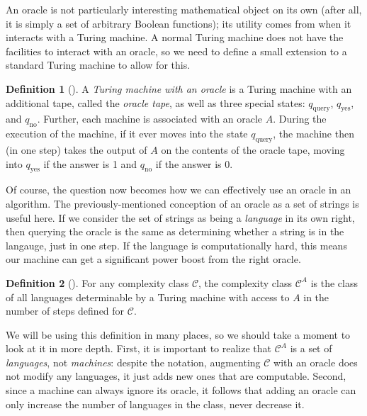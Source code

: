 \documentclass[english,12pt]{reedthesis}
\theoremstyle{plain}
\theoremstyle{definition}
\newtheorem{defn}[defn]{Definition}
\theoremstyle{remark}
\begin{document}

An oracle is not particularly interesting mathematical object on its own (after
all, it is simply a set of arbitrary Boolean functions); its utility comes from
when it interacts with a Turing machine. A normal Turing machine does not have
the facilities to interact with an oracle, so we need to define a small
extension to a standard Turing machine to allow for this.

\begin{defn}[{\cite[Def.\ 3.6]{AB09}}]\label{def:tm-oracle}
  A \emph{Turing machine with an oracle} is a Turing machine with an additional
  tape, called the \emph{oracle tape}, as well as three special states:
  $q_{\text{query}}$, $q_{\text{yes}}$, and $q_{\text{no}}$. Further, each
  machine is associated with an oracle $A$. During the execution of the machine,
  if it ever moves into the state $q_{\text{query}}$, the machine then (in one
  step) takes the output of $A$ on the contents of the oracle tape, moving into
  $q_{\text{yes}}$ if the answer is 1 and $q_{\text{no}}$ if the answer is 0.
\end{defn}

Of course, the question now becomes how we can effectively use an oracle in an
algorithm. The previously-mentioned conception of an oracle as a set of strings
is useful here. If we consider the set of strings as being a \emph{language} in
its own right, then querying the oracle is the same as determining whether a
string is in the langauge, just in one step. If the language is computationally
hard, this means our machine can get a significant power boost from the right
oracle.

\begin{defn}[{\cite[Def.\ 2.1]{AW09}}]\label{def:oracle-class}
  For any complexity class $\mathcal{C}$, the complexity class $\mathcal{C}^{A}$ is the class of all
  languages determinable by a Turing machine with access to $A$ in the number of
  steps defined for $\mathcal{C}$.
\end{defn}

We will be using this definition in many places, so we should take a moment to
look at it in more depth. First, it is important to realize that $\mathcal{C}^{A}$ is a
set of \emph{languages}, not \emph{machines}: despite the notation, augmenting
$\mathcal{C}$ with an oracle does not modify any languages, it just adds new ones that are
computable. Second, since a machine can always ignore its oracle, it follows
that adding an oracle can only increase the number of languages in the class,
never decrease it.
\end{document}
